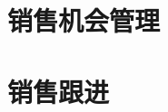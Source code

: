 \clearbeforecontfalse

\ifdefined\chanceCont{\begincont}\fi

    

\section{销售机会管理}
        
        

\section{销售跟进}
        
        
        
        
        

    

\ifdefined\chanceCont{\endcont}\fi


